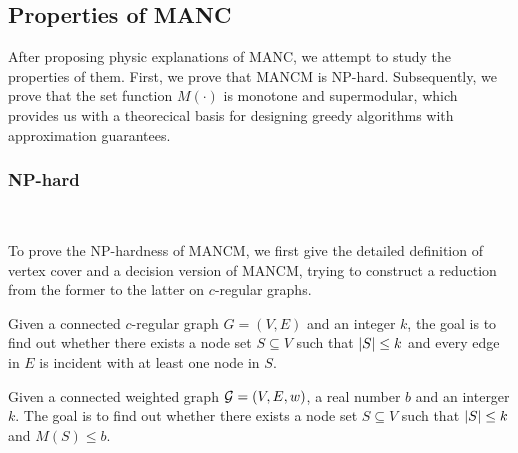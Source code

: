 \documentclass[sigconf]{acmart}
\begin{document}
\subsection{Properties of MANC}

After proposing physic explanations of MANC, we attempt to study the properties of them. First, we prove that MANCM is NP-hard.
Subsequently, we prove that the set function \(M(\cdot)\) is monotone and supermodular, which provides us with a theorecical basis for designing greedy algorithms with approximation guarantees.

\subsubsection{NP-hard}

\

To prove the NP-hardness of MANCM, we first give the detailed definition of vertex cover and a decision version of MANCM, trying to construct a reduction from the former to the latter on \(c\)-regular graphs.

\begin{problem}
Given a connected \(c\)-regular graph \(G=(V,E)\) and an integer \(k\), the goal is to find out whether there exists a node set \(S\subseteq V\) such that \(\left|S \right|\le k\) and every edge in \(E\) is incident with at least one node in \(S\).
\end{problem}

\begin{problem}
Given a connected weighted graph \(\mathcal{G}=(V,E,w)\), a real number \(b\) and an interger \(k\).
The goal is to find out whether there exists a node set \(S\subseteq V\) such that \(\left|S \right|\le k\) and \(M(S)\le b\).
\end{problem}
\end{document}
